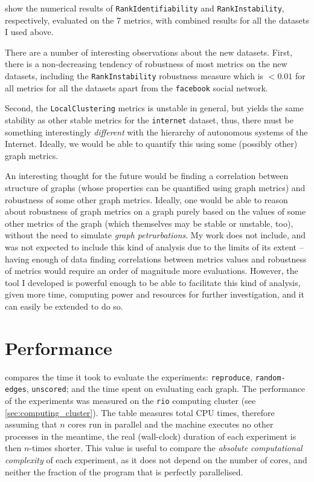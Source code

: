  show the numerical results of \texttt{RankIdentifiability} and \texttt{RankInstability}, respectively, evaluated on the 7 metrics, with combined results for all the datasets I used above.

There are a number of interesting observations about the new datasets.
First, there is a non-decreasing tendency of robustness of most metrics on the new datasets, including the \texttt{RankInstability} robustness measure which is $<0.01$ for all metrics for all the datasets apart from the \texttt{facebook} social network.

Second, the \texttt{LocalClustering} metrics is unstable in general, but yields the same stability as other stable metrics for the \texttt{internet} dataset, thus, there must be something interestingly \textsl{different} with the hierarchy of autonomous systems of the Internet.
Ideally, we would be able to quantify this using some (possibly other) graph metrics.

An interesting thought for the future would be finding a correlation between structure of graphs (whose properties can be quantified using graph metrics) and robustness of some other graph metrics.
Ideally, one would be able to reason about robustness of graph metrics on a graph purely based on the values of some other metrics of the graph (which themselves may be stable or unstable, too), without the need to simulate \textsl{graph petrurbations}.
My work does not include, and was not expected to include this kind of analysis due to the limits of its extent -- having enough of data finding correlations between metrics values and robustness of metrics would require an order of magnitude more evaluations.
However, the \graffs tool I developed is powerful enough to be able to facilitate this kind of analysis, given more time, computing power and resources for further investigation, and it can easily be extended to do so.




\section{Performance}




 compares the time it took to evaluate the experiments: \texttt{reproduce}, \texttt{random-edges}, \texttt{unscored}; and the time spent on evaluating each graph.
The performance of the experiments was measured on the \texttt{rio} computing cluster (see \autoref{sec:computing_cluster}).
The table measures total CPU times, therefore assuming that $n$ cores run in parallel and the machine executes no other processes in the meantime, the real (wall-clock) duration of each experiment is then $n$-times shorter.
This value is useful to compare the \textsl{absolute computational complexity} of each experiment, as it does not depend on the number of cores, and neither the fraction of the program that is perfectly parallelised.

